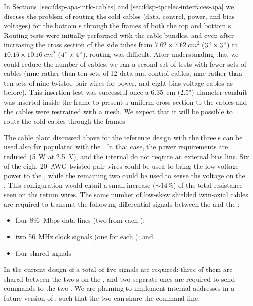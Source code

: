In Sections~\ref{sec:fdsp-apa-intfc-cables} and \ref{sec:fdsp-tpcelec-interfaces-apa}
we discuss the problem of routing the cold cables (data, control, power, and
bias voltages) for the bottom s through the frames of both
the top and bottom s. Routing tests were initially performed
with the  cable bundles, and even after increasing
the cross section of the side tubes from $\num{7.62}\times\SI{7.62}{cm^2}$ ($3"\times3"$)
to $\num{10.16}\times\SI{10.16}{cm^2}$ ($4"\times4"$), routing was difficult. After understanding that we
could reduce the number of cables, we ran a second set of tests with fewer sets
of cables (nine rather than ten sets of 12 data and control cables, nine rather than
ten sets of nine twisted-pair wires for power, and eight bias voltage cables as before).
This insertion test was successful once
a \SI{6.35}{cm} (2.5") diameter conduit was inserted inside the
 frame to present a uniform cross section to
the cables and the cables were restrained with a mesh. We expect that it will be possible
to route the cold cables through the  frames.

The cable plant discussed above for the reference design with the three s
can be used also for  populated with the
 . In that case, the power requirements are 
reduced (\SI{5}{W} at \SI{2.5}{V}), and the internal  do
not require an external bias line. Six of the eight \SI{20}{AWG} twisted-pair
wires could be used to bring the low-voltage power to the ,
while the remaining two could be used to sense the voltage on the .
This configuration would entail a small increase ($\sim14$\%) of the 
total resistance seen on the return wires. The same number of low-skew shielded
twin-axial cables are required to transmit the following differential signals
between the  and the :
\begin{itemize}
\item four \SI{896}{Mbps} data lines (two from each  );
\item two \SI{56}{MHz} clock signals (one for each  ); and
\item four shared  signals.
\end{itemize}
In the current design of   a total of five  signals
are required: three of them are shared between the two s on the
, and two separate ones are required to send commands to the
two  . We are planning to implement internal 
addresses in a future version of , such that the two 
can share the command line.

